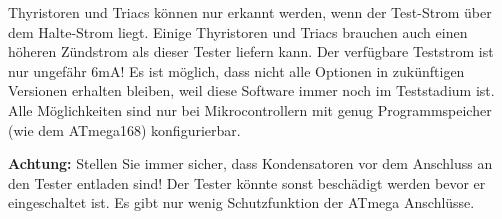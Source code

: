 Thyristoren und Triacs können nur erkannt werden, wenn der Test-Strom über dem Halte-Strom liegt.
Einige Thyristoren und Triacs brauchen auch einen höheren Zündstrom als dieser Tester liefern kann.
Der verfügbare Teststrom ist nur ungefähr 6mA!
Es ist möglich, dass nicht alle Optionen in zukünftigen Versionen erhalten bleiben, weil diese Software
immer noch im Teststadium ist.
Alle Möglichkeiten sind nur bei Mikrocontrollern mit genug Programmspeicher (wie dem ATmega168) konfigurierbar.

\vspace{1cm}
\textbf{{\Large Achtung:}} Stellen Sie immer sicher, dass Kondensatoren vor dem Anschluss an den Tester entladen sind!
Der Tester könnte sonst beschädigt werden bevor er eingeschaltet ist.
Es gibt nur wenig Schutzfunktion der ATmega Anschlüsse.


